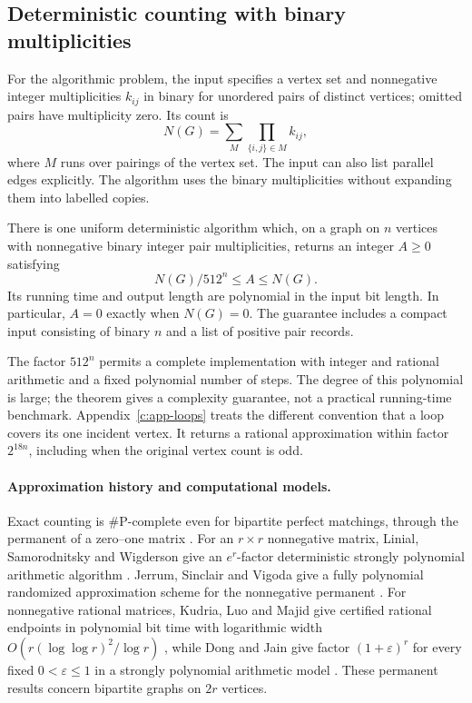 \subsection{Deterministic counting with binary multiplicities}

For the algorithmic problem, the input specifies a vertex set and
nonnegative integer multiplicities $k_{ij}$ in binary for unordered pairs
of distinct vertices; omitted pairs have multiplicity zero. Its count is
\[
 N(G)=\sum_M\prod_{\{i,j\}\in M} k_{ij},
\]
where $M$ runs over pairings of the vertex set. The input can also list
parallel edges explicitly. The algorithm uses the binary multiplicities
without expanding them into labelled copies.

\begin{theorem}
\label{thm:main}\label{thm:algorithm-guarantee}
There is one uniform deterministic algorithm which, on a graph on $n$
vertices with nonnegative binary integer pair multiplicities, returns an
integer $A\ge0$ satisfying
\[
                         N(G)/512^n\le A\le N(G).
\]
Its running time and output length are polynomial in the input bit length.
In particular, $A=0$ exactly when $N(G)=0$. The guarantee includes a compact
input consisting of binary $n$ and a list of positive pair records.
\end{theorem}

The factor $512^n$ permits a complete implementation with integer and
rational arithmetic and a fixed polynomial number of steps. The degree
of this polynomial is large; the theorem gives a complexity guarantee,
not a practical running-time benchmark. Appendix~\ref{c:app-loops} treats
the different convention that a loop covers its one incident vertex. It
returns a rational approximation within factor $2^{18n}$, including when
the original vertex count is odd.

\paragraph{Approximation history and computational models.}

Exact counting is $\#\mathrm P$-complete even for bipartite perfect
matchings, through the permanent of a zero--one matrix
\citep[Theorem~1]{Valiant1979}. For an $r\times r$ nonnegative matrix,
Linial, Samorodnitsky and Wigderson give an $e^r$-factor deterministic
strongly polynomial arithmetic algorithm
\citep[author version, Theorem~1.1]{LinialSamorodnitskyWigderson2000}.
Jerrum, Sinclair and Vigoda give a fully polynomial randomized
approximation scheme for the nonnegative permanent
\citep{JerrumSinclairVigoda2004}. For nonnegative rational matrices, Kudria, Luo and Majid give certified
rational endpoints in polynomial bit time with logarithmic width
$O(r(\log\log r)^2/\log r)$
\citep[Theorem~1.1]{KudriaLuoMajid2026}, while Dong and Jain give factor
$(1+\varepsilon)^r$ for every fixed $0<\varepsilon\le1$ in a strongly
polynomial arithmetic model
\citep[Theorem~1.1 and Section~1.1]{DongJain2026}.
These permanent results concern bipartite graphs on $2r$ vertices.

